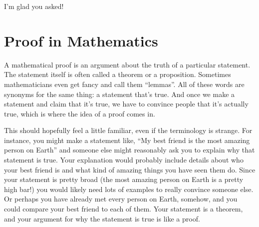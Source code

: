 \documentclass{ximera}
\begin{document}
I'm glad you asked!

\section{Proof in Mathematics}

A mathematical proof is an argument about the truth of a particular statement. The statement itself is often called a theorem or a proposition. Sometimes mathematicians even get fancy and call them ``lemmas''. All of these words are synonyms for the same thing: a statement that's true. And once we make a statement and claim that it's true, we have to convince people that it's actually true, which is where the idea of a proof comes in. 

This should hopefully feel a little familiar, even if the terminology is strange. For instance, you might make a statement like, ``My best friend is the most amazing person on Earth'' and someone else might reasonably ask you to explain why that statement is true. Your explanation would probably include details about who your best friend is and what kind of amazing things you have seen them do. Since your statement is pretty broad (the most amazing person on Earth is a pretty high bar!) you would likely need lots of examples to really convince someone else. Or perhaps you have already met every person on Earth, somehow, and you could compare your best friend to each of them. Your statement is a theorem, and your argument for why the statement is true is like a proof.
\end{document}
